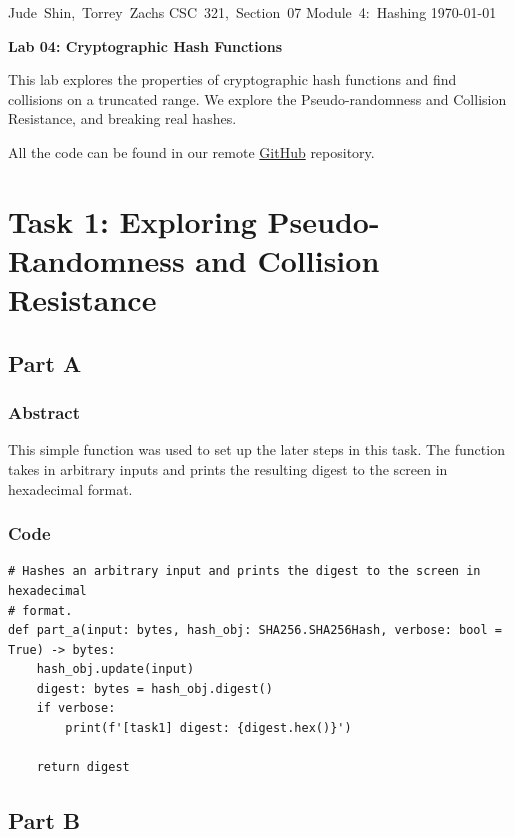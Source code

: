 \documentclass[11pt]{article}
\begin{document}
\hfill\vbox{\hbox{Jude Shin, Torrey Zachs}
		\hbox{CSC 321, Section 07}	
		\hbox{Module 4: Hashing}	
		\hbox{\today}}\par

\bigskip
\centerline{\Large\bf Lab 04: Cryptographic Hash Functions}\par
\bigskip

This lab explores the properties of cryptographic hash functions and find collisions on a truncated range. We explore the Pseudo-randomness and Collision Resistance, and breaking real hashes.

All the code can be found in our remote \href{https://github.com/jude-shin/CSC\_321}{GitHub} repository.

\section*{Task 1: Exploring Pseudo-Randomness and Collision Resistance}

\subsection*{Part A}
\subsubsection*{Abstract}

This simple function was used to set up the later steps in this task. The function takes in arbitrary inputs and prints the resulting digest to the screen in hexadecimal format.

\subsubsection*{Code}

\begin{lstlisting}
# Hashes an arbitrary input and prints the digest to the screen in hexadecimal
# format.
def part_a(input: bytes, hash_obj: SHA256.SHA256Hash, verbose: bool = True) -> bytes:
    hash_obj.update(input)
    digest: bytes = hash_obj.digest()
    if verbose: 
        print(f'[task1] digest: {digest.hex()}') 
    
    return digest
\end{lstlisting}

\subsection*{Part B}
\end{document}
